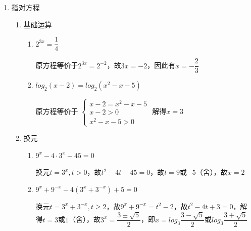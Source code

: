 \begin{enumerate}
\begin{enumerate}
        \item 已知$log_2(x+y) = log_2x+log_2y$, $\dfrac{4x}{x-1} + \dfrac{9y}{y-1}$的最小值为
        \begin{jieda}
            $log_2(x+y) = log_2(xy)$，故$x+y = xy$，即$x = \dfrac{y}{y-1}$，$y = \dfrac{x}{x-1}$，其中$x > 1, y > 1$.\\
            $\dfrac{4x}{x-1} + \dfrac{9y}{y-1} = \dfrac{4x}{x-1} + 9x = 9(x-1) + \dfrac{4}{x-1}+13 \geq 25$，在$x = \dfrac{5}{3}, y = \dfrac{5}{2}$时取等号.
        \end{jieda}
    \end{enumerate}
    \item 指对方程
    \begin{enumerate}
        \item 基础运算
        \begin{enumerate}
            \item $2^{3x} = \dfrac{1}{4}$
            \begin{jieda}
                原方程等价于$2^{3x} = 2^{-2}$，故$3x = -2$，因此有$x = -\dfrac{2}{3}$
            \end{jieda}
            \item $log_2(x-2) = log_2(x^2-x-5)$
            \begin{jieda}
                原方程等价于 $\left \{ \begin{array}{ll}
                     x-2 = x^2-x-5  \\
                     x - 2 > 0 \\
                     x^2-x-5 > 0
                \end{array}\right.$ 解得$x = 3$
            \end{jieda}
        \end{enumerate}
        \item 换元
        \begin{enumerate}
            \item $9^x-4 \cdot 3^x - 45 = 0$
            \begin{jieda}
                换元$t = 3^x, t > 0$，故$t^2-4t - 45 = 0$，故$t = 9$或$-5$（舍），故$x = 2$
            \end{jieda}
            \item $9^x + 9^{-x} - 4(3^x+3^{-x}) + 5 = 0$
            \begin{jieda}
                换元$t = 3^x+3^{-x}, t \geq 2$，故$9^x + 9^{-x} = t^2-2$，故$t^2-4t+3 = 0$，解得$t =3$或$1$（舍），故$3^x = \dfrac{3\pm\sqrt{5}}{2}$，即$x = log_3{\dfrac{3-\sqrt{5}}{2}}$或$log_3{\dfrac{3+\sqrt{5}}{2}}$

\end{jieda}
\end{enumerate}
\end{enumerate}
\end{enumerate}
